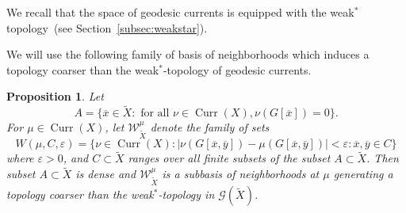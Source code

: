 \documentclass[12pt,article]{amsart}
\numberwithin{equation}{section}
\numberwithin{figure}{section}
\newtheorem{proposition}[equation]{Proposition}
\theoremstyle{definition}
\theoremstyle{plain}
\DeclareMathOperator{\Curr}{Curr}
\newcommand*{\wt}[1]{\widetilde{#1}}
\renewcommand{\epsilon}{\varepsilon}
\begin{document}
We recall that the space of geodesic currents is equipped with the weak$^*$ topology~(see Section~\ref{subsec:weakstar}).

We will use the following family of basis of neighborhoods which induces a topology coarser than the weak$^*$-topology of geodesic currents.

\begin{proposition}
Let \[
A = \{ \overline{x} \in \wt{X} \colon \mbox{ for all } \nu \in \Curr(X), \nu(G[\overline{x}])=0 \}.
\]
For $\mu \in \Curr(X)$, let $\mathcal{W}_{\wt{X}}^{\mu}$ denote the family of sets 
\[
W(\mu, C, \epsilon) = \{ \nu \in \Curr(X) \colon |\nu(G[\overline{x},\overline{y}]) - \mu(G[\overline{x},\overline{y}])| < \epsilon \colon \overline{x},\overline{y} \in C \}
\] where $\epsilon>0$,
and $C \subset \wt{X}$ ranges over all finite subsets of the subset $A \subset \wt{X}$. 
Then subset $A \subset \wt{X}$ is dense and
$\mathcal{W}_{\wt{X}}^{\mu}$ is a subbasis of neighborhoods at $\mu$ generating a topology coarser than the weak$^*$-topology in $\mathcal{G}(\wt{X})$.
\label{prop:weakflow}
\end{proposition}
\end{document}
